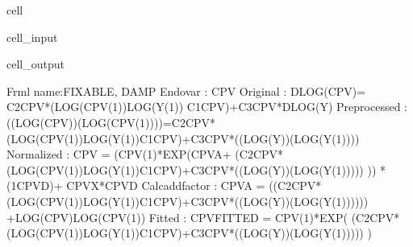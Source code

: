 \documentclass[letterpaper,10pt,english]{jupyterBook}
\begin{document}
\begin{sphinxuseclass}{cell}\begin{sphinxVerbatimInput}

\begin{sphinxuseclass}{cell_input}
\begin{sphinxVerbatim}[commandchars=\\\{\}]
         
\end{sphinxVerbatim}

\end{sphinxuseclass}\end{sphinxVerbatimInput}
\begin{sphinxVerbatimOutput}

\begin{sphinxuseclass}{cell_output}
\begin{sphinxVerbatim}[commandchars=\\\{\}]
Frml name:\PYGZlt{}FIXABLE, DAMP\PYGZgt{}
Endo\PYGZus{}var        : CPV
Original        :  DLOG(CPV)= \PYGZhy{}C2\PYGZus{}CPV*(LOG(CPV(\PYGZhy{}1))\PYGZhy{}LOG(Y(\PYGZhy{}1)) \PYGZhy{}        C1\PYGZus{}CPV)+C3\PYGZus{}CPV*DLOG(Y)
Preprocessed    : ((LOG(CPV))\PYGZhy{}(LOG(CPV(\PYGZhy{}1))))=\PYGZhy{}C2\PYGZus{}CPV*(LOG(CPV(\PYGZhy{}1))\PYGZhy{}LOG(Y(\PYGZhy{}1))\PYGZhy{}C1\PYGZus{}CPV)+C3\PYGZus{}CPV*((LOG(Y))\PYGZhy{}(LOG(Y(\PYGZhy{}1))))
Normalized      : CPV = (CPV(\PYGZhy{}1)*EXP(CPV\PYGZus{}A+ (\PYGZhy{}C2\PYGZus{}CPV*(LOG(CPV(\PYGZhy{}1))\PYGZhy{}LOG(Y(\PYGZhy{}1))\PYGZhy{}C1\PYGZus{}CPV)+C3\PYGZus{}CPV*((LOG(Y))\PYGZhy{}(LOG(Y(\PYGZhy{}1))))) )) * (1\PYGZhy{}CPV\PYGZus{}D)+ CPV\PYGZus{}X*CPV\PYGZus{}D 
Calc\PYGZus{}add\PYGZus{}factor : CPV\PYGZus{}A = \PYGZhy{} ((\PYGZhy{}C2\PYGZus{}CPV*(LOG(CPV(\PYGZhy{}1))\PYGZhy{}LOG(Y(\PYGZhy{}1))\PYGZhy{}C1\PYGZus{}CPV)+C3\PYGZus{}CPV*((LOG(Y))\PYGZhy{}(LOG(Y(\PYGZhy{}1)))))) +LOG(CPV)\PYGZhy{}LOG(CPV(\PYGZhy{}1))
Fitted          : CPV\PYGZus{}FITTED = CPV(\PYGZhy{}1)*EXP( (\PYGZhy{}C2\PYGZus{}CPV*(LOG(CPV(\PYGZhy{}1))\PYGZhy{}LOG(Y(\PYGZhy{}1))\PYGZhy{}C1\PYGZus{}CPV)+C3\PYGZus{}CPV*((LOG(Y))\PYGZhy{}(LOG(Y(\PYGZhy{}1))))) )


\end{sphinxVerbatim}
\end{sphinxuseclass}
\end{sphinxVerbatimOutput}
\end{sphinxuseclass}
\end{document}
